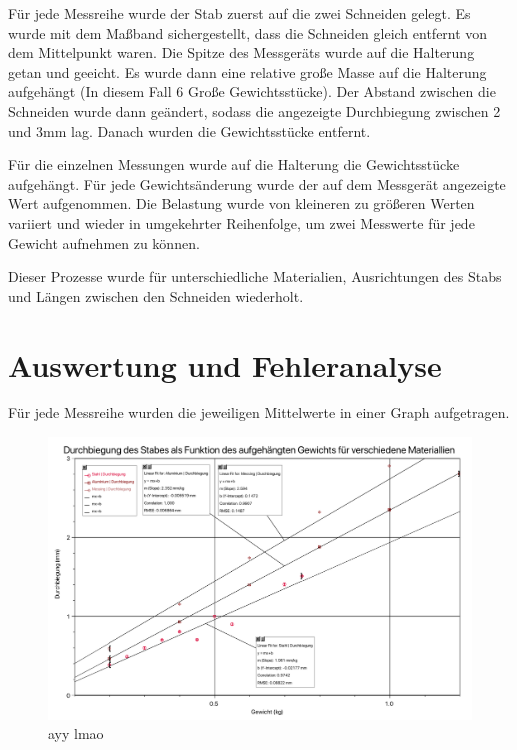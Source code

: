 \documentclass[11pt,a4paper]{article}
\begin{document}
Für jede Messreihe wurde der Stab zuerst auf die zwei Schneiden gelegt. Es wurde mit dem Maßband sichergestellt, dass die Schneiden gleich entfernt von dem Mittelpunkt waren. Die Spitze des Messgeräts wurde auf die Halterung getan und geeicht. Es wurde dann eine relative große Masse auf die Halterung aufgehängt (In diesem Fall 6 Große Gewichtsstücke). Der Abstand zwischen die Schneiden wurde dann geändert, sodass die angezeigte Durchbiegung zwischen 2 und 3mm lag. Danach wurden die Gewichtsstücke entfernt. 

Für die einzelnen Messungen wurde auf die Halterung die Gewichtsstücke aufgehängt. Für jede Gewichtsänderung wurde der auf dem Messgerät angezeigte Wert aufgenommen. Die Belastung wurde von kleineren zu größeren Werten variiert und wieder in umgekehrter Reihenfolge, um zwei Messwerte für jede Gewicht aufnehmen zu können. 

Dieser Prozesse wurde für unterschiedliche Materialien, Ausrichtungen des Stabs und  Längen zwischen den Schneiden wiederholt. 






\section{Auswertung und Fehleranalyse}
Für jede Messreihe wurden die jeweiligen Mittelwerte in einer Graph aufgetragen. 

\begin{figure}[h]
	\centering
	\includegraphics[width=\linewidth]{Abb2}
	\caption{ayy lmao}
\end{figure}
\end{document}

